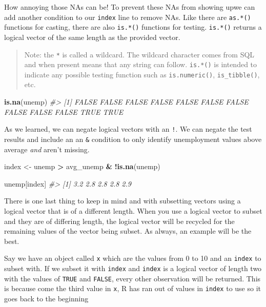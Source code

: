 \documentclass[
]{book}
\newenvironment{Shaded}{\begin{snugshade}}{\end{snugshade}}
\newcommand{\CommentTok}[1]{\textcolor[rgb]{0.56,0.35,0.01}{\textit{#1}}}
\newcommand{\KeywordTok}[1]{\textcolor[rgb]{0.13,0.29,0.53}{\textbf{#1}}}
\newcommand{\NormalTok}[1]{#1}
\newcommand{\OperatorTok}[1]{\textcolor[rgb]{0.81,0.36,0.00}{\textbf{#1}}}
\newcommand{\StringTok}[1]{\textcolor[rgb]{0.31,0.60,0.02}{#1}}
\begin{document}
How annoying those NAs can be! To prevent these NAs from showing upwe can add another condition to our \texttt{index} line to remove NAs. Like there are \texttt{as.*()} functions for casting, there are also \texttt{is.*()} functions for testing. \texttt{is.*()} returns a logical vector of the same length as the provided vector.

\begin{quote}
Note: the \texttt{*} is called a wildcard. The wildcard character comes from SQL and when present means that any string can follow. \texttt{is.*()} is intended to indicate any possible testing function such as \texttt{is.numeric()}, \texttt{is\_tibble()}, etc.
\end{quote}

\begin{Shaded}
\begin{Highlighting}[]
\KeywordTok{is.na}\NormalTok{(unemp)}
\CommentTok{\#\textgreater{}  [1] FALSE FALSE FALSE FALSE FALSE FALSE FALSE FALSE FALSE FALSE  TRUE  TRUE}
\end{Highlighting}
\end{Shaded}

As we learned, we can negate logical vectors with an \texttt{!}. We can negate the test results and include an an \texttt{\&} condition to only identify unemployment values above average \emph{and} aren't missing.

\begin{Shaded}
\begin{Highlighting}[]
\NormalTok{index \textless{}{-}}\StringTok{ }\NormalTok{unemp }\OperatorTok{\textgreater{}}\StringTok{ }\NormalTok{avg\_unemp }\OperatorTok{\&}\StringTok{ }\OperatorTok{!}\KeywordTok{is.na}\NormalTok{(unemp)}

\NormalTok{unemp[index]}
\CommentTok{\#\textgreater{} [1] 3.2 2.8 2.8 2.8 2.9}
\end{Highlighting}
\end{Shaded}

There is one last thing to keep in mind and with subsetting vectors using a logical vector that is of a different length. When you use a logical vector to subset and they are of differing length, the logical vector will be recycled for the remaining values of the vector being subset. As always, an example will be the best.

Say we have an object called \texttt{x} which are the values from 0 to 10 and an \texttt{index} to subset with. If we subset it with \texttt{index} and \texttt{index} is a logical vector of length two with the values of \texttt{TRUE} and \texttt{FALSE}, every other observation will be returned. This is because come the third value in \texttt{x}, R has ran out of values in \texttt{index} to use so it goes back to the beginning
\end{document}
